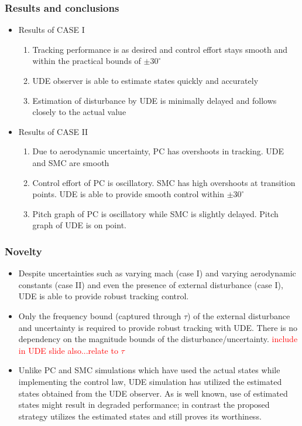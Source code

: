 \documentclass[table,10pt,red]{beamer}	%
\begin{document}
\begin{frame}
	\frametitle{Results and conclusions}
	\begin{itemize}
		\item Results of CASE I
		\begin{enumerate}
			\item Tracking performance is as desired and control effort stays smooth and within the practical bounds of  $\pm30^\circ$
			\item UDE observer is able to estimate states quickly and accurately
			\item Estimation of disturbance by UDE is minimally delayed and follows closely to the actual value
		\end{enumerate}
		
		\item Results of CASE II
		\begin{enumerate}
			\item Due to aerodynamic uncertainty, PC has overshoots in tracking. UDE and SMC are smooth 
			\item Control effort of PC is oscillatory. SMC has high overshoots at transition points. UDE is able to provide smooth control within $\pm 30^\circ$
			\item Pitch graph of PC is oscillatory while SMC is slightly delayed. Pitch graph of UDE is on point.
		\end{enumerate}
	\end{itemize}	
	
\end{frame}

\begin{frame}
	\frametitle{Novelty}
	\begin{itemize}
		\item Despite uncertainties such as varying mach (case I) and varying aerodynamic constants (case II) and even the presence of external disturbance (case I), UDE is able to provide robust tracking control.
		\bigskip
		
		\item Only the frequency bound (captured through $\tau$) of the external disturbance and uncertainty is required to provide robust tracking with UDE. There is no dependency on the magnitude bounds of the disturbance/uncertainty. \textcolor{red}{include in UDE slide also...relate to $\tau$}
		\bigskip
		
		\item Unlike PC and SMC simulations which have used the actual states while implementing the control law, UDE simulation has utilized the estimated
		states obtained from the UDE observer. As is well known, use of estimated states might result in degraded performance; in contrast the proposed strategy utilizes the estimated states and still proves its worthiness.
\end{itemize}
\end{frame}
\end{document}
